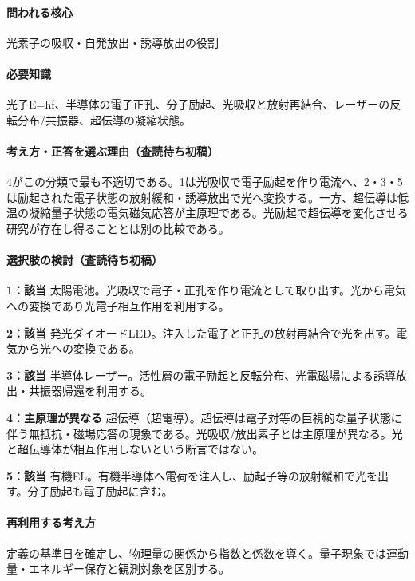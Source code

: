 \paragraph{問われる核心} 光素子の吸収・自発放出・誘導放出の役割

\paragraph{必要知識} 光子E=\allowbreak{}hf、半導体の電子正孔、分子励起、光吸収と放射再結合、レーザーの反転分布/共振器、超伝導の凝縮状態。

\paragraph{考え方・正答を選ぶ理由（査読待ち初稿）} 4がこの分類で最も不適切である。1は光吸収で電子励起を作り電流へ、2・3・5は励起された電子状態の放射緩和・誘導放出で光へ変換する。一方、超伝導は低温の凝縮量子状態の電気磁気応答が主原理である。光励起で超伝導を変化させる研究が存在し得ることとは別の比較である。

\paragraph{選択肢の検討（査読待ち初稿）}\mbox{}\par

\noindent\textbf{1：該当} 太陽電池。光吸収で電子・正孔を作り電流として取り出す。光から電気への変換であり光電子相互作用を利用する。\par

\noindent\textbf{2：該当} 発光ダイオードLED。注入した電子と正孔の放射再結合で光を出す。電気から光への変換である。\par

\noindent\textbf{3：該当} 半導体レーザー。活性層の電子励起と反転分布、光電磁場による誘導放出・共振器帰還を利用する。\par

\noindent\textbf{4：主原理が異なる} 超伝導（超電導）。超伝導は電子対等の巨視的な量子状態に伴う無抵抗・磁場応答の現象である。光吸収/放出素子とは主原理が異なる。光と超伝導体が相互作用しないという断言ではない。\par

\noindent\textbf{5：該当} 有機EL。有機半導体へ電荷を注入し、励起子等の放射緩和で光を出す。分子励起も電子励起に含む。\par

\paragraph{再利用する考え方} 定義の基準日を確定し、物理量の関係から指数と係数を導く。量子現象では運動量・エネルギー保存と観測対象を区別する。


